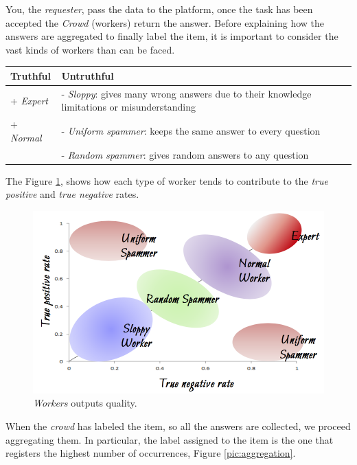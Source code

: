 You, the \emph{requester}, pass the data to the platform, once the task has been accepted the \emph{Crowd} (workers) return the answer. Before explaining how the answers are aggregated to finally label the item, it is important to consider the vast kinds of workers than can be faced.

\begin{center} %
\begin{tabular} {| p{5 cm} | p{5 cm} |}
\hline
\bf Truthful & \bf Untruthful \\ \hline
+ \emph{Expert} & - \emph{Sloppy}: gives many wrong answers due to their knowledge limitations or misunderstanding  \\
+ \emph{Normal}  & - \emph{Uniform spammer}: keeps the same answer to every question \\
& - \emph{Random spammer}: gives random answers to any question \\
\hline
\end{tabular}
\end{center}


The Figure \ref{pic:worker_crowdsourcing}, shows how each type of worker tends to contribute to the \emph{true positive} and \emph{true negative}  rates.

\begin{figure}[H]%
 \centering
 \includegraphics[width=13cm]{./img/08/worker_crowdsourcing}
 \caption{\label{pic:worker_crowdsourcing} \emph{Workers} outputs quality.}
\end{figure}

When the \emph{crowd} has labeled the item, so all the answers are collected, we proceed aggregating them. In particular, the label assigned to the item is the one that registers the highest number of occurrences, Figure \ref{pic:aggregation}.

